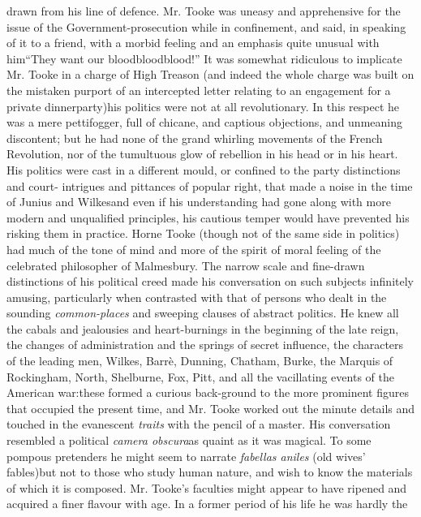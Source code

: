 drawn from his line of defence. Mr. Tooke was uneasy and
apprehensive for the issue of the Government-prosecution while in
confinement, and said, in speaking of it to a friend, with a
morbid feeling and an emphasis quite unusual with him\textemdash ``They want
our blood\textemdash blood\textemdash blood!'' It was somewhat ridiculous to implicate
Mr. Tooke in a charge of High Treason (and indeed the whole charge
was built on the mistaken purport of an intercepted letter
relating to an engagement for a private dinnerparty)\textemdash his politics
were not at all revolutionary. In this respect he was a mere
pettifogger, full of chicane, and captious objections, and
unmeaning discontent; but he had none of the grand whirling
movements of the French Revolution, nor of the tumultuous glow of
rebellion in his head or in his heart. His politics were cast in a
different mould, or confined to the party distinctions and court-
intrigues and pittances of popular right, that made a noise in the
time of Junius and Wilkes\textemdash and even if his understanding had gone
along with more modern and unqualified principles, his cautious
temper would have prevented his risking them in practice. Horne
Tooke (though not of the same side in politics) had much of the
tone of mind and more of the spirit of moral feeling of the
celebrated philosopher of Malmesbury. The narrow scale and
fine-drawn distinctions of his political creed made his
conversation on such subjects infinitely amusing, particularly
when contrasted with that of persons who dealt in the sounding
\emph{common-places} and sweeping clauses of abstract politics. He knew
all the cabals and jealousies and heart-burnings in the beginning
of the late reign, the changes of administration and the springs
of secret influence, the characters of the leading men, Wilkes,
Barrè, Dunning, Chatham, Burke, the Marquis of Rockingham, North,
Shelburne, Fox, Pitt, and all the vacillating events of the
American war:\textemdash these formed a curious back-ground to the more
prominent figures that occupied the present time, and Mr. Tooke
worked out the minute details and touched in the evanescent
\emph{traits} with the pencil of a master. His conversation resembled a
political \emph{camera obscura}\textemdash as quaint as it was magical. To some
pompous pretenders he might seem to narrate \emph{fabellas aniles} (old
wives' fables)\textemdash but not to those who study human nature, and wish
to know the materials of which it is composed. Mr. Tooke's
faculties might appear to have ripened and acquired a finer
flavour with age. In a former period of his life he was hardly the
